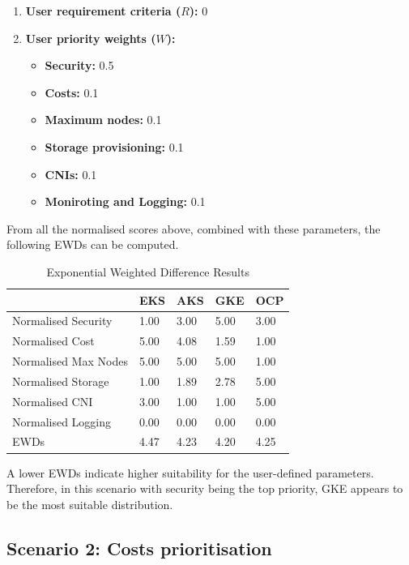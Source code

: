 \begin{enumerate}
\def\labelenumi{\arabic{enumi}.}
\tightlist
\item
  \textbf{User requirement criteria (\(R\)):} 0
\item
  \textbf{User priority weights (\(W\)):}

  \begin{itemize}
  \tightlist
  \item
    \textbf{Security:} 0.5
  \item
    \textbf{Costs:} 0.1
  \item
    \textbf{Maximum nodes:} 0.1
  \item
    \textbf{Storage provisioning:} 0.1
  \item
    \textbf{CNIs:} 0.1
  \item
    \textbf{Moniroting and Logging:} 0.1
  \end{itemize}
\end{enumerate}

From all the normalised scores above, combined with these parameters, the following EWDs can be computed.

\begin{table}[!ht]
    \centering
    \begin{tabular}{|p{4cm}|p{2cm}|p{2cm}|p{2cm}|p{2cm}|} %
    \hline
         & EKS& AKS& GKE& OCP\\ \hline
        Normalised Security& 1.00& 3.00& 5.00& 3.00\\ \hline
        Normalised Cost& 5.00& 4.08& 1.59& 1.00\\ \hline
        Normalised Max Nodes& 5.00& 5.00& 5.00& 1.00\\ \hline
        Normalised Storage& 1.00& 1.89& 2.78& 5.00\\ \hline
        Normalised CNI& 3.00& 1.00& 1.00& 5.00\\ \hline
 Normalised Logging& 0.00& 0.00& 0.00&0.00\\\hline
 EWDs& 4.47& 4.23& 4.20&4.25\\\hline
    \end{tabular}
    \caption{Exponential Weighted Difference Results} 
    \label{tab:cost-analysis}
\end{table}

A lower EWDs indicate higher suitability for the user-defined parameters. Therefore, in this scenario with security being the top priority, GKE appears to be the most suitable distribution.

\subsection{Scenario 2: Costs prioritisation}

